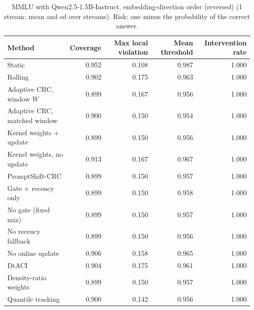 \begin{table}[H]
\centering
\small
\caption{MMLU with Qwen2.5-1.5B-Instruct, embedding-direction order (reversed) (1 stream; mean and sd over streams). Risk: one minus the probability of the correct answer.}
\label{tab:mmlu_pc1_reverse}
\begin{tabular}{lrrrr}
\toprule
Method & Coverage & Max local violation & Mean threshold & Intervention rate \\
\midrule
Static & 0.952 & 0.108 & 0.987 & 1.000 \\
Rolling & 0.902 & 0.175 & 0.963 & 1.000 \\
Adaptive CRC, window $W$ & 0.899 & 0.167 & 0.956 & 1.000 \\
Adaptive CRC, matched window & 0.900 & 0.150 & 0.954 & 1.000 \\
Kernel weights + update & 0.899 & 0.150 & 0.956 & 1.000 \\
Kernel weights, no update & 0.913 & 0.167 & 0.967 & 1.000 \\
PromptShift-CRC & 0.899 & 0.150 & 0.957 & 1.000 \\
Gate + recency only & 0.899 & 0.150 & 0.958 & 1.000 \\
No gate (fixed mix) & 0.899 & 0.150 & 0.957 & 1.000 \\
No recency fallback & 0.899 & 0.150 & 0.956 & 1.000 \\
No online update & 0.906 & 0.158 & 0.965 & 1.000 \\
DtACI & 0.904 & 0.175 & 0.961 & 1.000 \\
Density-ratio weights & 0.899 & 0.150 & 0.957 & 1.000 \\
Quantile tracking & 0.900 & 0.142 & 0.956 & 1.000 \\
\bottomrule
\end{tabular}
\end{table}


